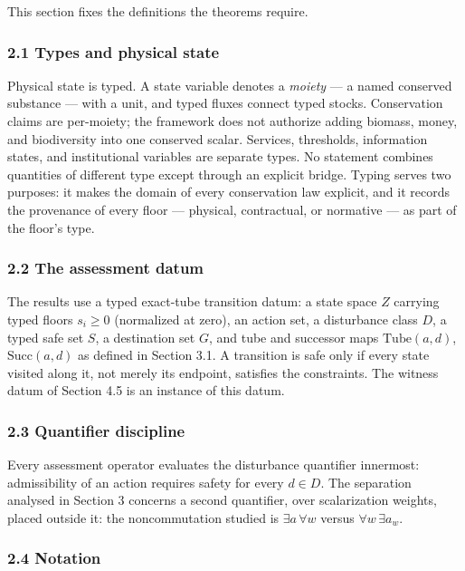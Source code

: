 \documentclass[11pt]{article}
\begin{document}
This section fixes the definitions the theorems require.

\subsubsection{2.1 Types and physical
state}\label{types-and-physical-state}

Physical state is typed. A state variable denotes a \emph{moiety} --- a
named conserved substance --- with a unit, and typed fluxes connect
typed stocks. Conservation claims are per-moiety; the framework does not
authorize adding biomass, money, and biodiversity into one conserved
scalar. Services, thresholds, information states, and institutional
variables are separate types. No statement combines quantities of different type except through an explicit bridge. Typing serves two purposes: it makes the domain of every
conservation law explicit, and it records the provenance of every floor
--- physical, contractual, or normative --- as part of the floor's type.

\subsubsection{2.2 The assessment datum}\label{the-assessment-datum}

The results use a typed exact-tube transition datum: a state space \(Z\) carrying typed floors \(s_i \ge 0\) (normalized at zero), an action set, a disturbance class \(D\), a typed safe set \(S\), a destination set \(G\), and tube and successor maps \(\mathrm{Tube}(a,d)\), \(\mathrm{Succ}(a,d)\) as defined in Section 3.1. A transition is safe only if every state visited along it, not merely its endpoint, satisfies the constraints. The witness datum of Section 4.5 is an instance of this datum.

\subsubsection{2.3 Quantifier discipline}\label{quantifier-discipline}

Every assessment operator evaluates the disturbance quantifier innermost: admissibility of an action requires safety for every \(d \in D\). The separation analysed in Section 3 concerns a second quantifier, over scalarization weights, placed outside it: the noncommutation studied is \(\exists a\, \forall w\) versus \(\forall w\, \exists a_w\).

\subsubsection{2.4 Notation}\label{notation}
\end{document}
